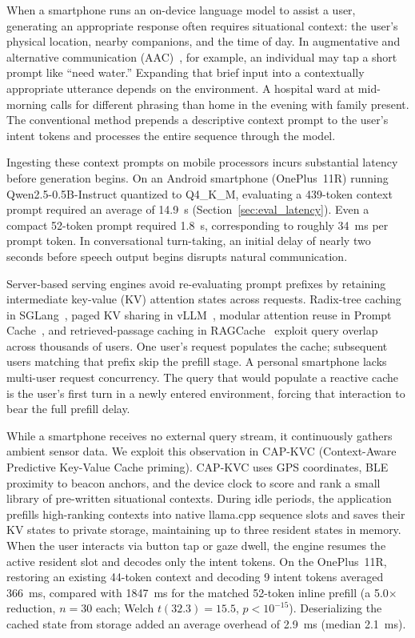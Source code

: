\documentclass[conference]{IEEEtran}
\begin{document}
When a smartphone runs an on-device language model to assist a user, generating an appropriate response often requires situational context: the user's physical location, nearby companions, and the time of day. In augmentative and alternative communication (AAC)~\cite{beukelman2020}, for example, an individual may tap a short prompt like ``need water.'' Expanding that brief input into a contextually appropriate utterance depends on the environment. A hospital ward at mid-morning calls for different phrasing than home in the evening with family present. The conventional method prepends a descriptive context prompt to the user's intent tokens and processes the entire sequence through the model.

Ingesting these context prompts on mobile processors incurs substantial latency before generation begins. On an Android smartphone (OnePlus~11R) running Qwen2.5-0.5B-Instruct quantized to Q4\_K\_M, evaluating a 439-token context prompt required an average of 14.9~s (Section~\ref{sec:eval_latency}). Even a compact 52-token prompt required 1.8~s, corresponding to roughly 34~ms per prompt token. In conversational turn-taking, an initial delay of nearly two seconds before speech output begins disrupts natural communication.

Server-based serving engines avoid re-evaluating prompt prefixes by retaining intermediate key-value (KV) attention states across requests. Radix-tree caching in SGLang~\cite{sglang}, paged KV sharing in vLLM~\cite{vllm}, modular attention reuse in Prompt Cache~\cite{promptcache}, and retrieved-passage caching in RAGCache~\cite{ragcache} exploit query overlap across thousands of users. One user's request populates the cache; subsequent users matching that prefix skip the prefill stage. A personal smartphone lacks multi-user request concurrency. The query that would populate a reactive cache is the user's first turn in a newly entered environment, forcing that interaction to bear the full prefill delay.

While a smartphone receives no external query stream, it continuously gathers ambient sensor data. We exploit this observation in CAP-KVC (Context-Aware Predictive Key-Value Cache priming). CAP-KVC uses GPS coordinates, BLE proximity to beacon anchors, and the device clock to score and rank a small library of pre-written situational contexts. During idle periods, the application prefills high-ranking contexts into native llama.cpp sequence slots and saves their KV states to private storage, maintaining up to three resident states in memory. When the user interacts via button tap or gaze dwell, the engine resumes the active resident slot and decodes only the intent tokens. On the OnePlus~11R, restoring an existing 44-token context and decoding 9 intent tokens averaged 366~ms, compared with 1847~ms for the matched 52-token inline prefill (a 5.0$\times$ reduction, $n=30$ each; Welch $t(32.3)=15.5$, $p<10^{-15}$). Deserializing the cached state from storage added an average overhead of 2.9~ms (median 2.1~ms).
\end{document}
